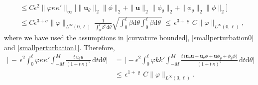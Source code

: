 \documentclass[10pt, reqno]{amsart}
\numberwithin{equation}{section}
\theoremstyle{definition}
\begin{document}
{{\begin{align*}
 &\leq
 C\epsilon^2\|\varphi \kappa\kappa'\|_\infty
 \Big[\|{\mathbf u}_{\theta}\|_2\|\phi\|_2+\|{\mathbf u}\|_2\|\phi_{\theta}\|_2 +\|\phi_{\theta}\|_2\|\phi\|_2\Big]
\nonumber\\[2mm]
 &\leq
 C\epsilon^{3+\sigma}\|\varphi\|_{L^\infty(0,\ell)}\, \frac{1}{\displaystyle\int_0^{\ell}\beta^5 {\mathrm d}\theta}
 \sqrt{\int_0^{\ell} \beta {\mathrm d}\theta \int_0^{\ell}\beta {\mathrm d}\theta\,}
 \,\leq\, \epsilon^{3+\varrho}\,C \|\varphi\|_{L^\infty(0,\ell)},
\end{align*}
where we have used the assumptions in \eqref{curvature bounded}, \eqref{smallperturbation0} and \eqref{smallperturbation1}.
Therefore,
\begin{align}\label{inedtitiesterm2}
\Bigg|\,-\, \epsilon^2 \int_0^\ell \varphi \kappa\kappa'\int_{-M}^{M} \frac{t\,u_\theta u}{(1+t\,\kappa)^2}
 \,{\mathrm d}t{\mathrm d}\theta\Bigg|
 &\,=\,
\Bigg| -\epsilon^2 \int_0^\ell \varphi kk'\int_{-M}^{M}
 \frac{t\,\big({\mathbf u}_{\theta}{\mathbf u}+{\mathbf u}_{\theta}\phi+{\mathbf u}\phi_{\theta}+\phi_{\theta}\phi\big) }{(1+t\,\kappa)^2}
 \,{\mathrm d}t{\mathrm d}\theta\Bigg|
  \nonumber\\[2mm]
  &\,\leq\, \epsilon^{1+\varrho}\,C \|\varphi\|_{L^\infty(0,\ell)}.
\end{align}






}}
\end{document}
